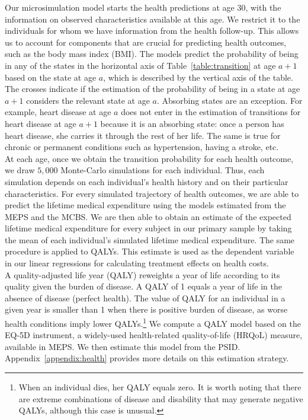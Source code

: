 \noindent Our microsimulation model starts the health predictions at age 30, with the information on observed characteristics available at this age. We restrict it to the individuals for whom we have information from the health follow-up. This allows us to account for components that are crucial for predicting health outcomes, such as the body mass index (BMI). The models predict the probability of being in any of the states in the horizontal axis of Table~\ref{table:transition} at age $a+1$ based on the state at age $a$, which is described by the vertical axis of the table. The crosses indicate if the estimation of the probability of being in a state at age $a+1$ considers the relevant state at age $a$. Absorbing states are an exception. For example, heart disease at age $a$ does not enter in the estimation of transitions for heart disease at age $a+1$ because it is an absorbing state: once a person has heart disease, she carries it through the rest of her life. The same is true for chronic or permanent conditions such as hypertension, having a stroke, etc. \\

\noindent At each age, once we obtain the transition probability for each health outcome, we draw $5,000$ Monte-Carlo simulations for each individual. Thus, each simulation depends on each individual's health history and on their particular characteristics. For every simulated trajectory of health outcomes, we are able to predict the lifetime medical expenditure using the models estimated from the MEPS and the MCBS. We are then able to obtain an estimate of the expected lifetime medical expenditure for every subject in our primary sample by taking the mean of each individual's simulated lifetime medical expenditure. The same procedure is applied to QALYs. This estimate is used as the dependent variable in our linear regressions for calculating treatment effects on health costs. \\

\noindent A quality-adjusted life year (QALY) reweights a year of life according to its quality given the burden of disease. A QALY of 1 equals a year of life in the absence of disease (perfect health). The value of QALY for an individual in a given year is smaller than 1 when there is positive burden of disease, as worse health conditions imply lower QALYs.\footnote{When an individual dies, her QALY equals zero. It is worth noting that there are extreme combinations of disease and disability that may generate negative QALYs, although this case is unusual.} We compute a QALY model based on the EQ-5D instrument, a widely-used health-related quality-of-life (HRQoL) measure, available in MEPS. We then estimate this model from the PSID. Appendix~\ref{appendix:health} provides more details on this estimation strategy. \\

